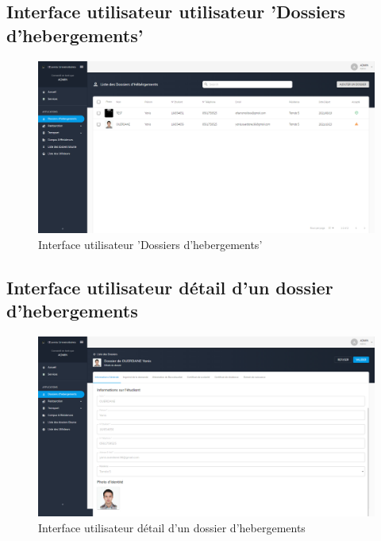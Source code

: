     \subsection{Interface utilisateur utilisateur 'Dossiers d'hebergements'}
    \begin{figure}[H]
        \centering
        \includegraphics[scale=0.21]{PFE Screens/Admin/Hebergement/Liste des Dossiers d'Hébérgements.jpg}
        \caption{Interface utilisateur 'Dossiers d'hebergements'}
    \end{figure}

    \subsection{Interface utilisateur détail d'un dossier d'hebergements}
    \begin{figure}[H]
        \centering
        \includegraphics[scale=0.21]{PFE Screens/Admin/Hebergement/Detail.jpg}
        \caption{Interface utilisateur détail d'un dossier d'hebergements}
    \end{figure}

